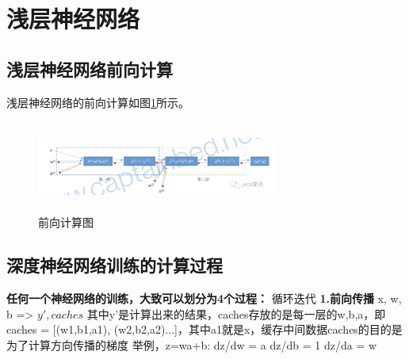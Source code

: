 \section{浅层神经网络}
\subsection{浅层神经网络前向计算}
浅层神经网络的前向计算如图\ref{fig:forward_calc}所示。
\begin{figure}[htb]			%
	\centering
	\includegraphics[width=8cm, height=3cm]{pictures/浅层神经网络/forward_calc}
	\caption{前向计算图}
	\label{fig:forward_calc}
\end{figure}

\subsection{深度神经网络训练的计算过程}
\textbf{任何一个神经网络的训练，大致可以划分为4个过程：}
循环迭代
\textbf{1.前向传播}
x, w, b => $y', caches$
其中y'是计算出来的结果，caches存放的是每一层的w,b,a，即caches = [(w1,b1,a1), (w2,b2,a2)...]，其中a1就是x，缓存中间数据caches的目的是为了计算方向传播的梯度
举例，z=wa+b:
dz/dw = a
dz/db = 1
dz/da = w